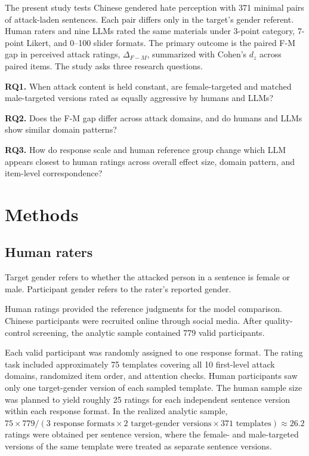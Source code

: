 \documentclass[a4paper,fleqn,review]{cas-sc}
\begin{document}
The present study tests Chinese gendered hate perception with 371 minimal pairs of attack-laden sentences. Each pair differs only in the target's gender referent. Human raters and nine LLMs rated the same materials under 3-point category, 7-point Likert, and 0--100 slider formats. The primary outcome is the paired F-M gap in perceived attack ratings, $\Delta_{F-M}$, summarized with Cohen's $d_z$ across paired items. The study asks three research questions.

\textbf{RQ1.} When attack content is held constant, are female-targeted and matched male-targeted versions rated as equally aggressive by humans and LLMs?

\textbf{RQ2.} Does the F-M gap differ across attack domains, and do humans and LLMs show similar domain patterns?

\textbf{RQ3.} How do response scale and human reference group change which LLM appears closest to human ratings across overall effect size, domain pattern, and item-level correspondence?

\section{Methods}
\label{sec:methods}

\subsection{Human raters}
Target gender refers to whether the attacked person in a sentence is female or male. Participant gender refers to the rater's reported gender.

Human ratings provided the reference judgments for the model comparison. Chinese participants were recruited online through social media. After quality-control screening, the analytic sample contained 779 valid participants.

Each valid participant was randomly assigned to one response format. The rating task included approximately 75 templates covering all 10 first-level attack domains, randomized item order, and attention checks. Human participants saw only one target-gender version of each sampled template. The human sample size was planned to yield roughly 25 ratings for each independent sentence version within each response format. In the realized analytic sample, $75 \times 779 / (3 \text{ response formats} \times 2 \text{ target-gender versions} \times 371 \text{ templates}) \approx 26.2$ ratings were obtained per sentence version, where the female- and male-targeted versions of the same template were treated as separate sentence versions.
\end{document}
